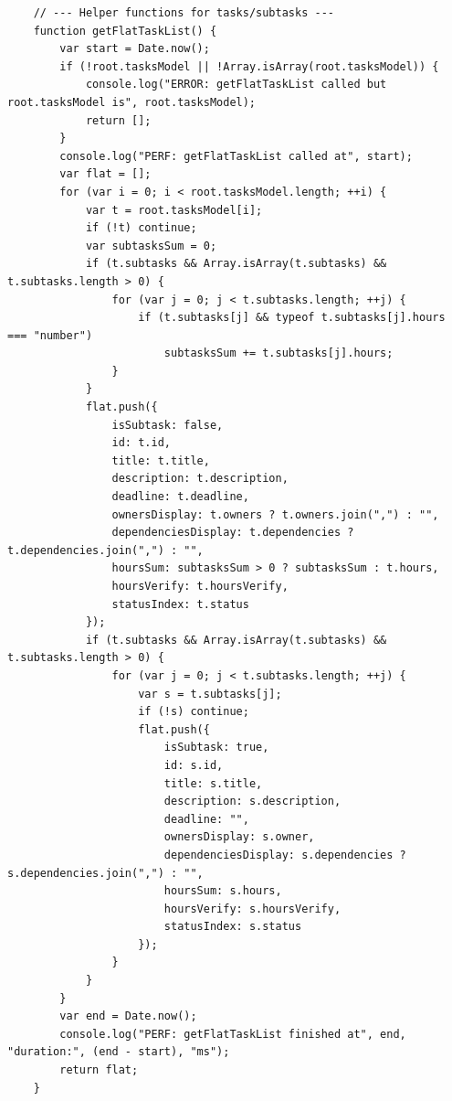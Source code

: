 \documentclass{report}
\begin{document}
\begin{lstlisting}
    // --- Helper functions for tasks/subtasks ---
    function getFlatTaskList() {
        var start = Date.now();
        if (!root.tasksModel || !Array.isArray(root.tasksModel)) {
            console.log("ERROR: getFlatTaskList called but root.tasksModel is", root.tasksModel);
            return [];
        }
        console.log("PERF: getFlatTaskList called at", start);
        var flat = [];
        for (var i = 0; i < root.tasksModel.length; ++i) {
            var t = root.tasksModel[i];
            if (!t) continue;
            var subtasksSum = 0;
            if (t.subtasks && Array.isArray(t.subtasks) && t.subtasks.length > 0) {
                for (var j = 0; j < t.subtasks.length; ++j) {
                    if (t.subtasks[j] && typeof t.subtasks[j].hours === "number")
                        subtasksSum += t.subtasks[j].hours;
                }
            }
            flat.push({
                isSubtask: false,
                id: t.id,
                title: t.title,
                description: t.description,
                deadline: t.deadline,
                ownersDisplay: t.owners ? t.owners.join(",") : "",
                dependenciesDisplay: t.dependencies ? t.dependencies.join(",") : "",
                hoursSum: subtasksSum > 0 ? subtasksSum : t.hours,
                hoursVerify: t.hoursVerify,
                statusIndex: t.status
            });
            if (t.subtasks && Array.isArray(t.subtasks) && t.subtasks.length > 0) {
                for (var j = 0; j < t.subtasks.length; ++j) {
                    var s = t.subtasks[j];
                    if (!s) continue;
                    flat.push({
                        isSubtask: true,
                        id: s.id,
                        title: s.title,
                        description: s.description,
                        deadline: "",
                        ownersDisplay: s.owner,
                        dependenciesDisplay: s.dependencies ? s.dependencies.join(",") : "",
                        hoursSum: s.hours,
                        hoursVerify: s.hoursVerify,
                        statusIndex: s.status
                    });
                }
            }
        }
        var end = Date.now();
        console.log("PERF: getFlatTaskList finished at", end, "duration:", (end - start), "ms");
        return flat;
    }


\end{lstlisting}
\end{document}
